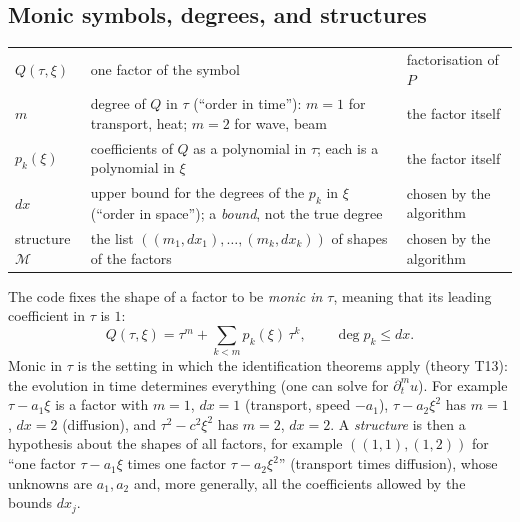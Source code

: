 \documentclass[11pt,a4paper]{article}
\theoremstyle{definition}
\newcommand{\thy}[1]{\textcolor{cG}{\textsf{\footnotesize(theory #1)}}}
\begin{document}
\subsection{Monic symbols, degrees, and structures}
\begin{symbols}
\begin{tabular}{@{}L{2.3cm}L{6.2cm}L{4.5cm}@{}}
$Q(\tau,\xi)$ & one factor of the symbol & factorisation of $P$\\
$m$ & degree of $Q$ in $\tau$ (``order in time''): $m=1$ for transport, heat; $m=2$ for wave, beam & the factor itself\\
$p_k(\xi)$ & coefficients of $Q$ as a polynomial in $\tau$; each is a polynomial in $\xi$ & the factor itself\\
$dx$ & upper bound for the degrees of the $p_k$ in $\xi$ (``order in space''); a \emph{bound}, not the true degree & chosen by the algorithm\\
structure $\mathcal M$ & the list $((m_1,dx_1),\dots,(m_k,dx_k))$ of shapes of the factors & chosen by the algorithm\\
\end{tabular}
\end{symbols}
The code fixes the shape of a factor to be \emph{monic in $\tau$}, meaning that its leading coefficient in $\tau$ is $1$:
\begin{equation}\label{eq:monic}
Q(\tau,\xi)=\tau^m+\sum_{k<m}p_k(\xi)\,\tau^k,\qquad \deg p_k\le dx .
\end{equation}
Monic in $\tau$ is the setting in which the identification theorems apply \thy{T13}: the evolution in time determines everything (one can solve for $\partial_t^mu$). For example $\tau-a_1\xi$ is a factor with $m=1$, $dx=1$ (transport, speed $-a_1$), $\tau-a_2\xi^2$ has $m=1$, $dx=2$ (diffusion), and $\tau^2-c^2\xi^2$ has $m=2$, $dx=2$. A \emph{structure} is then a hypothesis about the shapes of all factors, for example $((1,1),(1,2))$ for ``one factor $\tau-a_1\xi$ times one factor $\tau-a_2\xi^2$'' (transport times diffusion), whose unknowns are $a_1,a_2$ and, more generally, all the coefficients allowed by the bounds $dx_j$.
\end{document}
